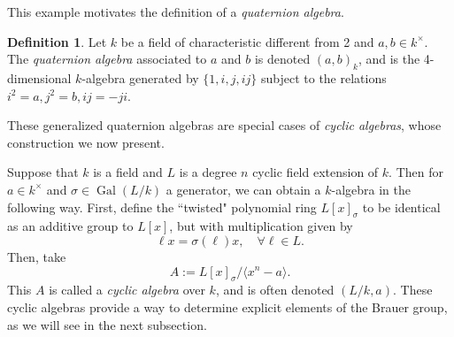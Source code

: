 \documentclass[12pt,twoside]{reedthesis}
\theoremstyle{plain}
\theoremstyle{definition}
\newtheorem{definition}{Definition}[section]
\theoremstyle{remark}
\newcommand{\Gal}{\operatorname{Gal}}
\begin{document}
\noindent This example motivates the definition of a \emph{quaternion algebra}.
\begin{definition}
Let $k$ be a field of characteristic different from 2 and $a,b\in k^\times$. The \emph{quaternion algebra} associated to $a$ and $b$ is denoted $(a,b)_k$, and is the 4-dimensional $k$-algebra generated by $\{1,i,j,ij\}$ subject to the relations $i^2=a, j^2=b, ij=-ji$.
\end{definition}
\noindent These generalized quaternion algebras are special cases of \emph{cyclic algebras}, whose construction we now present.

Suppose that $k$ is a field and $L$ is a degree $n$ cyclic field extension of $k$. Then for $a\in k^\times$ and $\sigma\in\Gal(L/k)$ a generator, we can obtain a $k$-algebra in the following way. First, define the ``twisted" polynomial ring $L[x]_\sigma$ to be identical as an additive group to $L[x]$, but with multiplication given by
\[
\ell x=\sigma(\ell)x,\quad\forall\ell\in L.
\]
Then, take 
\[
A:=L[x]_\sigma/\langle x^n-a\rangle.
\]
This $A$ is called a \emph{cyclic algebra} over $k$, and is often denoted $(L/k,a)$. These cyclic algebras provide a way to determine explicit elements of the Brauer group, as we will see in the next subsection.
\end{document}
